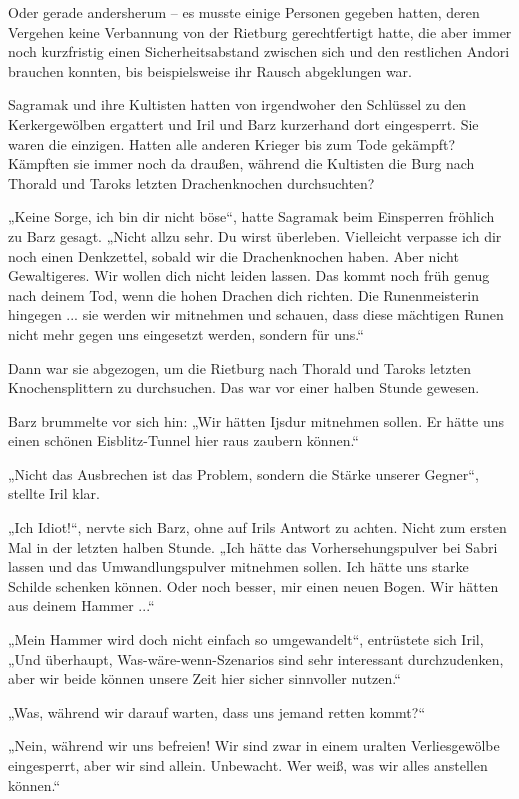 Oder gerade andersherum – es musste einige Personen gegeben hatten, deren Vergehen keine Verbannung von der Rietburg gerechtfertigt hatte, die aber immer noch kurzfristig einen Sicherheitsabstand zwischen sich und den restlichen Andori brauchen konnten, bis beispielsweise ihr Rausch abgeklungen war.

Sagramak und ihre Kultisten hatten von irgendwoher den Schlüssel zu den Kerkergewölben ergattert und Iril und Barz kurzerhand dort eingesperrt. Sie waren die einzigen. Hatten alle anderen Krieger bis zum Tode gekämpft? Kämpften sie immer noch da draußen, während die Kultisten die Burg nach Thorald und Taroks letzten Drachenknochen durchsuchten?

„Keine Sorge, ich bin dir nicht böse“, hatte Sagramak beim Einsperren fröhlich zu Barz gesagt. „Nicht allzu sehr. Du wirst überleben. Vielleicht verpasse ich dir noch einen Denkzettel, sobald wir die Drachenknochen haben. Aber nicht Gewaltigeres. Wir wollen dich nicht leiden lassen. Das kommt noch früh genug nach deinem Tod, wenn die hohen Drachen dich richten. Die Runenmeisterin hingegen ... sie werden wir mitnehmen und schauen, dass diese mächtigen Runen nicht mehr gegen uns eingesetzt werden, sondern für uns.“

Dann war sie abgezogen, um die Rietburg nach Thorald und Taroks letzten Knochensplittern zu durchsuchen. Das war vor einer halben Stunde gewesen.

Barz brummelte vor sich hin: „Wir hätten Ijsdur mitnehmen sollen. Er hätte uns einen schönen Eisblitz-Tunnel hier raus zaubern können.“

„Nicht das Ausbrechen ist das Problem, sondern die Stärke unserer Gegner“, stellte Iril klar.

„Ich Idiot!“, nervte sich Barz, ohne auf Irils Antwort zu achten. Nicht zum ersten Mal in der letzten halben Stunde. „Ich hätte das Vorhersehungspulver bei Sabri lassen und das Umwandlungspulver mitnehmen sollen. Ich hätte uns starke Schilde schenken können. Oder noch besser, mir einen neuen Bogen. Wir hätten aus deinem Hammer ...“

„Mein Hammer wird doch nicht einfach so umgewandelt“, entrüstete sich Iril, „Und überhaupt, Was-wäre-wenn-Szenarios sind sehr interessant durchzudenken, aber wir beide können unsere Zeit hier sicher sinnvoller nutzen.“

„Was, während wir darauf warten, dass uns jemand retten kommt?“

„Nein, während wir uns befreien! Wir sind zwar in einem uralten Verliesgewölbe eingesperrt, aber wir sind allein. Unbewacht. Wer weiß, was wir alles anstellen können.“


